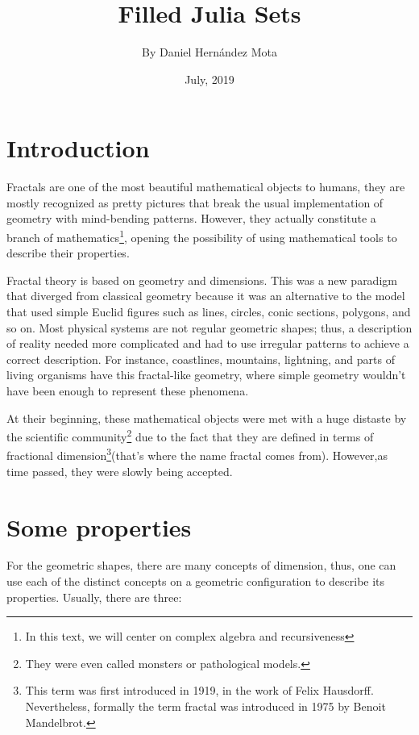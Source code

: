 \documentclass{article}
\title{Filled Julia Sets}
\author{By Daniel Hernández Mota}
\date{July, 2019}
\begin{document}
\maketitle

\newpage
\section{Introduction}

Fractals are one of the most beautiful mathematical objects to humans, they are mostly recognized as pretty pictures that break the usual implementation of geometry with mind-bending patterns. However, they actually constitute a branch of mathematics\footnote{In this text, we will center on complex algebra and recursiveness}, opening the possibility of using mathematical tools to describe their properties\cite{Edyta}. 

Fractal theory is based on geometry and dimensions. This was a new paradigm that diverged from classical geometry because it was an alternative to the model that used simple Euclid figures such as lines, circles, conic sections, polygons, and so on. Most physical systems are not regular geometric shapes; thus, a description of reality needed more complicated and had to use irregular patterns to achieve a correct description\cite{Crownover}. For instance, coastlines, mountains, lightning, and parts of living organisms have this fractal-like geometry, where simple geometry wouldn't have been enough to represent these phenomena\cite{Edyta}.

At their beginning, these mathematical objects were met with a huge distaste by the scientific community\footnote{They were even called monsters or pathological models.} due to the fact that they are defined in terms of fractional dimension\footnote{This term was first introduced in 1919, in the work of Felix Hausdorff. Nevertheless, formally the term fractal was introduced in 1975 by Benoit Mandelbrot.}(that's where the name fractal comes from). However,as time passed, they were slowly being accepted. 
\section{Some properties}
For the geometric shapes, there are many concepts of dimension, thus, one can use each of the distinct concepts on a geometric configuration to describe its properties. Usually, there are three\cite{Crownover}:
\end{document}

